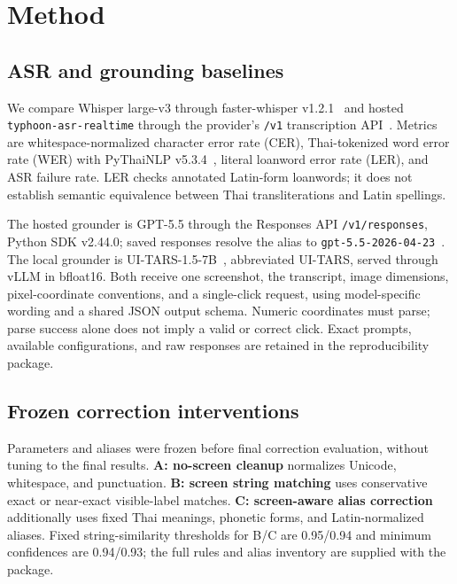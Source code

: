 \section{Method}

\subsection{ASR and grounding baselines}

We compare Whisper large-v3 through faster-whisper v1.2.1~\cite{radford2023whisper,fasterwhisper} and hosted \texttt{typhoon-asr-realtime} through the provider's \texttt{/v1} transcription API~\cite{opentyphoon}. Metrics are whitespace-normalized character error rate (CER), Thai-tokenized word error rate (WER) with PyThaiNLP v5.3.4~\cite{pythainlp}, literal loanword error rate (LER), and ASR failure rate. LER checks annotated Latin-form loanwords; it does not establish semantic equivalence between Thai transliterations and Latin spellings.

The hosted grounder is GPT-5.5 through the Responses API \texttt{/v1/responses}, Python SDK v2.44.0; saved responses resolve the alias to \texttt{gpt-5.5-2026-04-23}~\cite{openaiapi}. The local grounder is UI-TARS-1.5-7B~\cite{uitars}, abbreviated UI-TARS, served through vLLM in bfloat16. Both receive one screenshot, the transcript, image dimensions, pixel-coordinate conventions, and a single-click request, using model-specific wording and a shared JSON output schema. Numeric coordinates must parse; parse success alone does not imply a valid or correct click. Exact prompts, available configurations, and raw responses are retained in the reproducibility package.

\subsection{Frozen correction interventions}

Parameters and aliases were frozen before final correction evaluation, without tuning to the final results. \textbf{A: no-screen cleanup} normalizes Unicode, whitespace, and punctuation. \textbf{B: screen string matching} uses conservative exact or near-exact visible-label matches. \textbf{C: screen-aware alias correction} additionally uses fixed Thai meanings, phonetic forms, and Latin-normalized aliases. Fixed string-similarity thresholds for B/C are 0.95/0.94 and minimum confidences are 0.94/0.93; the full rules and alias inventory are supplied with the package.

